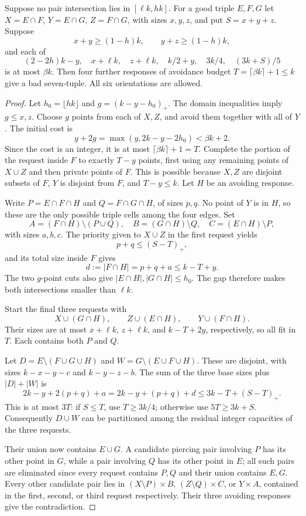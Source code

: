\begin{lemma}\label{lem:gaptwo}
Suppose no pair intersection lies in $[\ell k,hk]$. For a good triple $E,F,G$ let $X=E\cap F$, $Y=E\cap G$, $Z=F\cap G$, with sizes $x,y,z$, and put $S=x+y+z$. Suppose
\[
x+y\ge(1-h)k,\qquad y+z\ge(1-h)k,
\]
and each of
\[
(2-2h)k-y,\quad x+\ell k,\quad z+\ell k,\quad k/2+y,\quad 3k/4,\quad (3k+S)/5
\]
is at most $\beta k$. Then four further responses of avoidance budget $T=\lceil\beta k\rceil+1\le k$ give a bad seven-tuple. All six orientations are allowed.
\end{lemma}
\begin{proof}
Let $h_0=\lfloor hk\rfloor$ and $g=(k-y-h_0)_+$. The domain inequalities imply $g\le x,z$. Choose $g$ points from each of $X,Z$, and avoid them together with all of $Y$. The initial cost is
\[
y+2g=\max(y,2k-y-2h_0)<\beta k+2.
\]
Since the cost is an integer, it is at most $\lceil\beta k\rceil+1=T$. Complete the portion of the request inside $F$ to exactly $T-y$ points, first using any remaining points of $X\cup Z$ and then private points of $F$. This is possible because $X,Z$ are disjoint subsets of $F$, $Y$ is disjoint from $F$, and $T-y\le k$. Let $H$ be an avoiding response.

Write $P=E\cap F\cap H$ and $Q=F\cap G\cap H$, of sizes $p,q$. No point of $Y$ is in $H$, so these are the only possible triple cells among the four edges. Set
\[
A=(F\cap H)\setminus(P\cup Q),\quad B=(G\cap H)\setminus Q,\quad C=(E\cap H)\setminus P,
\]
with sizes $a,b,c$. The priority given to $X\cup Z$ in the first request yields
\[
p+q\le(S-T)_+,
\]
and its total size inside $F$ gives
\[
d:=|F\cap H|=p+q+a\le k-T+y.
\]
The two $g$-point cuts also give $|E\cap H|,|G\cap H|\le h_0$. The gap therefore makes both intersections smaller than $\ell k$.

Start the final three requests with
\[
X\cup(G\cap H),\qquad Z\cup(E\cap H),\qquad Y\cup(F\cap H).
\]
Their sizes are at most $x+\ell k$, $z+\ell k$, and $k-T+2y$, respectively, so all fit in $T$. Each contains both $P$ and $Q$.

Let $D=E\setminus(F\cup G\cup H)$ and $W=G\setminus(E\cup F\cup H)$. These are disjoint, with sizes $k-x-y-c$ and $k-y-z-b$. The sum of the three base sizes plus $|D|+|W|$ is
\[
2k-y+2(p+q)+a=2k-y+(p+q)+d\le3k-T+(S-T)_+.
\]
This is at most $3T$: if $S\le T$, use $T\ge3k/4$; otherwise use $5T\ge3k+S$. Consequently $D\cup W$ can be partitioned among the residual integer capacities of the three requests.

Their union now contains $E\cup G$. A candidate piercing pair involving $P$ has its other point in $G$, while a pair involving $Q$ has its other point in $E$; all such pairs are eliminated since every request contains $P,Q$ and their union contains $E,G$. Every other candidate pair lies in $(X\setminus P)\times B$, $(Z\setminus Q)\times C$, or $Y\times A$, contained in the first, second, or third request respectively. Their three avoiding responses give the contradiction.
\end{proof}

